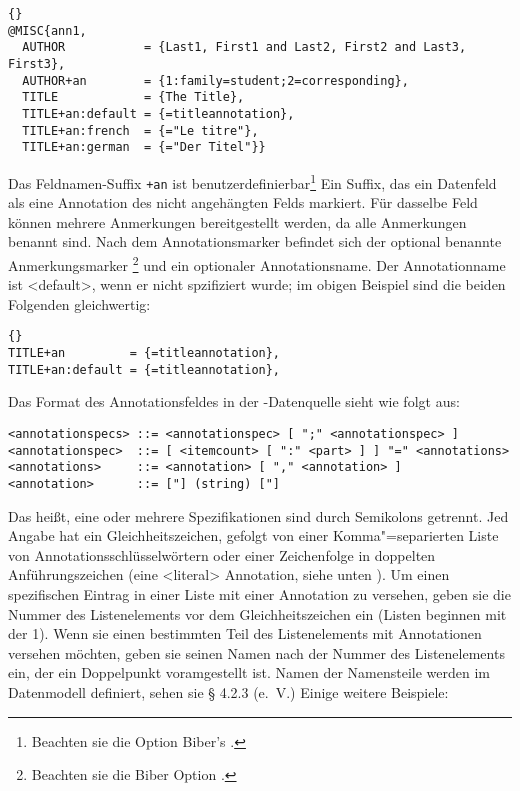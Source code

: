 \documentclass{ltxdockit}[2011/03/25]
\newcommand*{\biber}{Biber\xspace}
\begin{document}
\begin{lstlisting}[style=bibtex]{}
@MISC{ann1,
  AUTHOR           = {Last1, First1 and Last2, First2 and Last3, First3},
  AUTHOR+an        = {1:family=student;2=corresponding},
  TITLE            = {The Title},
  TITLE+an:default = {=titleannotation},
  TITLE+an:french  = {="Le titre"},
  TITLE+an:german  = {="Der Titel"}}
\end{lstlisting}
%
Das Feldnamen-Suffix \texttt{+an} ist benutzerdefinierbar\footnote{Beachten sie die Option \biber's .} Ein Suffix, das ein Datenfeld als eine Annotation des nicht angehängten 
Felds markiert. Für dasselbe Feld können mehrere Anmerkungen bereitgestellt werden, da alle 
Anmerkungen benannt sind. Nach dem Annotationsmarker befindet sich der optional benannte Anmerkungsmarker  \footnote{Beachten sie die \biber Option .} und 
ein optionaler Annotationsname. Der Annotationname ist <default>, wenn er nicht spzifiziert wurde;
im obigen Beispiel sind die beiden Folgenden gleichwertig:

\begin{lstlisting}[style=bibtex]{}
TITLE+an         = {=titleannotation},
TITLE+an:default = {=titleannotation},
\end{lstlisting}
%
Das Format des Annotationsfeldes in der  \bibtex -Datenquelle sieht wie folgt aus:

\begin{lstlisting}
<annotationspecs> ::= <annotationspec> [ ";" <annotationspec> ]
<annotationspec>  ::= [ <itemcount> [ ":" <part> ] ] "=" <annotations>
<annotations>     ::= <annotation> [ "," <annotation> ]
<annotation>      ::= ["] (string) ["]
\end{lstlisting}
%
Das heißt, eine oder mehrere Spezifikationen sind durch Semikolons getrennt. 
Jed Angabe hat ein Gleichheitszeichen, gefolgt von einer Komma"=separierten Liste von 
Annotationsschlüsselwörtern oder einer Zeichenfolge in doppelten Anführungszeichen 
(eine <literal> Annotation, siehe unten ). Um einen spezifischen Eintrag in einer Liste mit 
einer Annotation zu versehen, geben sie die Nummer des Listenelements vor dem Gleichheitszeichen ein
(Listen beginnen mit der 1). Wenn sie einen bestimmten Teil des Listenelements mit Annotationen
versehen möchten, geben sie seinen Namen nach der Nummer des Listenelements ein, der ein Doppelpunkt voramgestellt ist. Namen der Namensteile werden im Datenmodell definiert, sehen sie § 4.2.3 (e.~V.) %
Einige weitere Beispiele:
\end{document}
